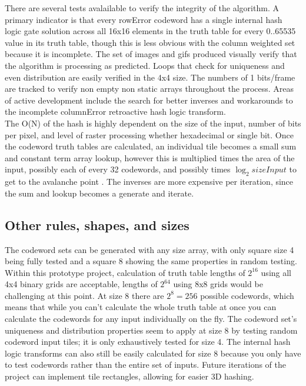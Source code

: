 \documentclass[11pt]{article}
\begin{document}
There are several tests avalailable to verify the integrity of the algorithm. A primary indicator is that every rowError codeword has a single internal hash logic gate solution across all 16x16 elements in the truth table for every 0..65535 value in its truth table, though this is less obvious with the column weighted set because it is incomplete. The set of images and gifs produced visually verify that the algorithm is processing as predicted. Loops that check for uniqueness and even distribution are easily verified in the 4x4 size. The numbers of 1 bits/frame are tracked to verify non empty non static arrays throughout the process. Areas of active development include the search for better inverses and workarounds to the incomplete columnError retroactive hash logic transform.\\

The O(N) of the hash is highly dependent on the size of the input, number of bits per pixel, and level of raster processing whether hexadecimal or single bit. Once the codeword truth tables are calculated, an individual tile becomes a small sum and constant term array lookup, however this is multiplied times the area of the input, possibly each of every 32 codewords, and possibly times $\log_2 sizeInput$ to get to the avalanche point . The inverses are more expensive per iteration, since the sum and lookup becomes a generate and iterate.\\



\newpage

\subsection{Other rules, shapes, and sizes}

The codeword sets can be generated with any size array, with only square size 4 being fully tested and a square 8 showing the same properties in random testing. Within this prototype project, calculation of truth table lengths of $2^{16}$ using all 4x4 binary grids are acceptable, lengths of $2^{64}$ using 8x8 grids would be challenging at this point. At size 8 there are $2^8=256$ possible codewords, which means that while you can't calculate the whole truth table at once you can calculate the codewords for any input individually on the fly. The codeword set's uniqueness and distribution properties seem to apply at size 8 by testing random codeword input tiles; it is only exhaustively tested for size 4. The internal hash logic transforms can also still be easily calculated for size 8 because you only have to test codewords rather than the entire set of inputs. Future iterations of the project can implement tile rectangles, allowing for easier 3D hashing. \\
\end{document}

